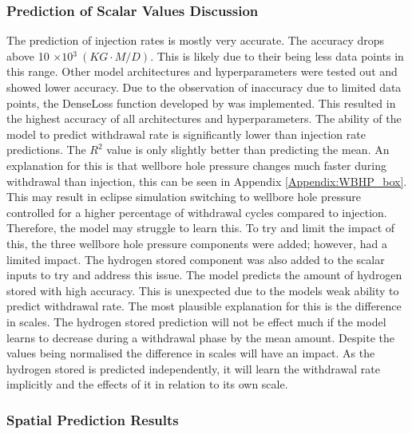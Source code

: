 \subsubsection{Prediction of Scalar Values Discussion}

The prediction of injection rates is mostly very accurate. The accuracy drops above 10 $\times 10{^3} \ (KG \cdot M / D)$. This is likely due to their being less data points in this range. Other model architectures and hyperparameters were tested out and showed lower accuracy. Due to the observation of inaccuracy due to limited data points, the DenseLoss function developed by \citet{steininger2021density} was implemented. This resulted in the highest accuracy of all architectures and hyperparameters. The ability of the model to predict withdrawal rate is significantly lower than injection rate predictions. The $R^2$ value is only slightly better than predicting the mean. An explanation for this is that wellbore hole pressure changes much faster during withdrawal than injection, this can be seen in Appendix \ref{Appendix:WBHP_box}. This may result in eclipse simulation switching to wellbore hole pressure controlled for a higher percentage of withdrawal cycles compared to injection. Therefore, the model may struggle to learn this. To try and limit the impact of this, the three wellbore hole pressure components were added; however, had a limited impact. The hydrogen stored component was also added to the scalar inputs to try and address this issue. The model predicts the amount of hydrogen stored with high accuracy. This is unexpected due to the models weak ability to predict withdrawal rate. The most plausible explanation for this is the difference in scales. The hydrogen stored prediction will not be effect much if the model learns to decrease during a withdrawal phase by the mean amount. Despite the values being normalised the difference in scales will have an impact. As the hydrogen stored is predicted independently, it will learn the withdrawal rate implicitly and the effects of it in relation to its own scale. 
\FloatBarrier
\subsubsection{Spatial Prediction Results}



